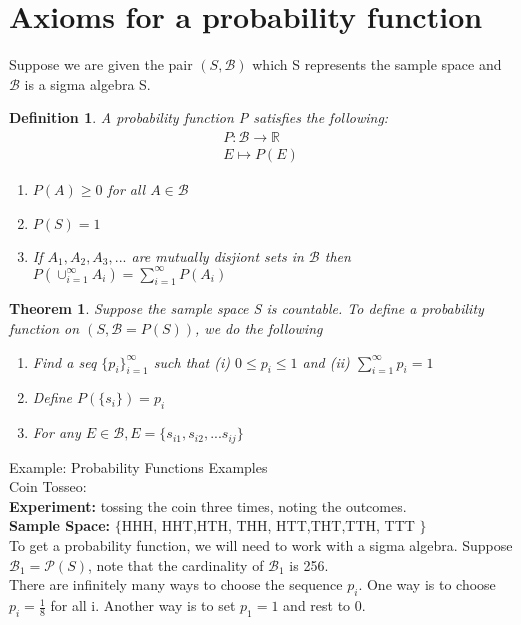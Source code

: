 \documentclass[11pt,oneside]{book}
\theoremstyle{break}
\theoremstyle{break}
\newtheorem{thm}{Theorem}[section]
\newtheorem{defn}{Definition}[corL]
\newcommand{\example}{\color{green}Example: \color{black}}
\begin{document}
	\section[Axioms for a probability function]{Axioms for a probability function}
	Suppose we are given the pair $(S,\mathcal{B})$ which S represents the sample space and $\mathcal{B}$ is a sigma algebra S.\\
	\begin{defn}
	A probability function P satisfies the following:\begin{align*}
	P:\mathcal{B}\rightarrow \mathbb{R}\\
	E \mapsto P(E)
	\end{align*}
	\begin{enumerate}
	\item $P(A)\geq 0$ for all $A\in \mathcal{B}$
	\item $P(S)=1$
	\item If $A_1,A_2,A_3,...$ are mutually disjiont sets in $\mathcal{B}$ then $P(\cup_{i=1}^{\infty}A_i)=\sum_{i=1}^{\infty}P(A_i)$
	\end{enumerate}
	\end{defn}
	\begin{thm}
	Suppose the sample space S is countable. To define a probability function on $(S,\mathcal{B}=P(S))$, we do the following \begin{enumerate}
	\item Find a seq $\{p_i\}_{i=1}^{\infty}$ such that (i) $0\leq p_i\leq 1$ and (ii) $\sum_{i=1}^{\infty}p_i=1$
	\item Define $P(\{s_i\})=p_i$
	\item For any $E\in \mathcal{B}, E=\{s_{i1},s_{i2},...s_{ij}\}$
	\end{enumerate}
	\end{thm}
	\example Probability Functions Examples\\
\text{\quad} Coin Tosseo: \\
\text{\quad} \textbf{Experiment: }tossing the coin three times, noting the outcomes.\\
\text{\quad} \textbf{Sample Space:} $\{$HHH, HHT,HTH, THH, HTT,THT,TTH, TTT $\}$\\
	To get a probability function, we will need to work with a sigma algebra. Suppose $\mathcal{B}_1=\mathcal{P}(S)$, note that the cardinality of $\mathcal{B}_1$ is 256.\\
	There are infinitely many ways to choose the sequence ${p_i}$. One way is to choose $p_i=\frac{1}{8}$ for all i. Another way is to set $p_1=1$ and rest to 0.\\
\end{document}
